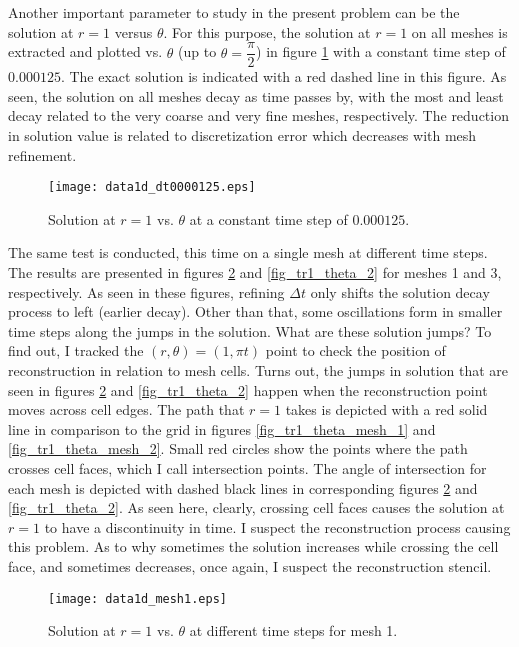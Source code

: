 \documentclass{article}
\begin{document}
Another important parameter to study in the present problem can be the solution at $r=1$ versus $\theta$. For this purpose, the solution at $r=1$ on all meshes is extracted and plotted vs. $\theta$ (up to $\theta=\dfrac{\pi}{2}$) in figure \ref{fig_tr1_theta_3} with a constant time step of $0.000125$. The exact solution is indicated with a red dashed line in this figure. As seen, the solution on all meshes decay as time passes by, with the most and least decay related to the very coarse and very fine meshes, respectively. The reduction in solution value is related to discretization error which decreases with mesh refinement.

\begin{figure}[H]
\centering
\texttt{[image: data1d\_dt0000125.eps]}
\caption{Solution at $r=1$ vs. $\theta$ at a constant time step of $0.000125$.}
\label{fig_tr1_theta_3}
\end{figure}

The same test is conducted, this time on a single mesh at different time steps. The results are presented in figures \ref{fig_tr1_theta_1} and \ref{fig_tr1_theta_2} for meshes 1 and 3, respectively. As seen in these figures, refining $\Delta t$ only shifts the solution decay process to left (earlier decay). Other than that, some oscillations form in smaller time steps along the jumps in the solution. What are these solution jumps? To find out, I tracked the $(r,\theta)=(1,\pi t)$ point to check the position of reconstruction in relation to mesh cells. Turns out, the jumps in solution that are seen in figures \ref{fig_tr1_theta_1} and \ref{fig_tr1_theta_2} happen when the reconstruction point moves across cell edges. The path that $r=1$ takes is depicted with a red solid line in comparison to the grid in figures \ref{fig_tr1_theta_mesh_1} and \ref{fig_tr1_theta_mesh_2}. Small red circles show the points where the path crosses cell faces, which I call intersection points. The angle of intersection for each mesh is depicted with dashed black lines in corresponding figures \ref{fig_tr1_theta_1} and \ref{fig_tr1_theta_2}. As seen here, clearly, crossing cell faces causes the solution at $r=1$ to have a discontinuity in time. I suspect the reconstruction process causing this problem. As to why sometimes the solution increases while crossing the cell face, and sometimes decreases, once again, I suspect the reconstruction stencil.

\begin{figure}[H]
\centering
\texttt{[image: data1d\_mesh1.eps]}
\caption{Solution at $r=1$ vs. $\theta$ at different time steps for mesh 1.}
\label{fig_tr1_theta_1}
\end{figure}
\end{document}
